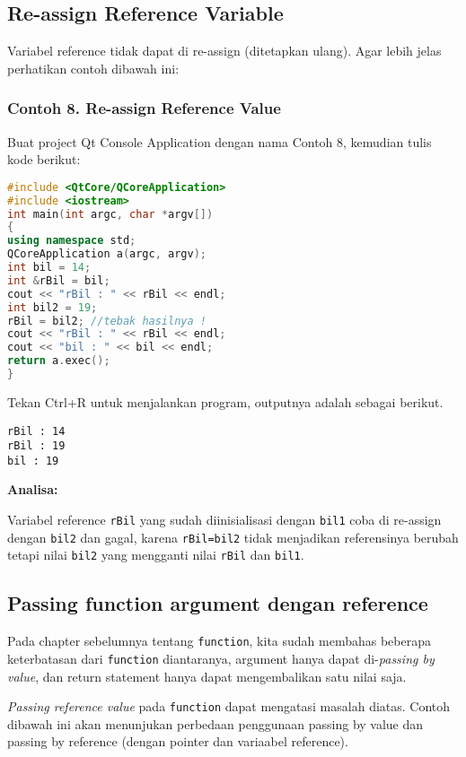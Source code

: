 \subsection{Re-assign Reference
Variable}\label{re-assign-reference-variable}

Variabel reference tidak dapat di re-assign (ditetapkan ulang). Agar
lebih jelas perhatikan contoh dibawah ini:

\subsubsection*{Contoh 8. Re-assign Reference Value}

Buat project Qt Console Application dengan nama Contoh 8, kemudian tulis
kode berikut:

\begin{lstlisting}[language=c++]
#include <QtCore/QCoreApplication>
#include <iostream>
int main(int argc, char *argv[])
{
using namespace std;
QCoreApplication a(argc, argv);
int bil = 14;
int &rBil = bil;
cout << "rBil : " << rBil << endl;
int bil2 = 19;
rBil = bil2; //tebak hasilnya !
cout << "rBil : " << rBil << endl;
cout << "bil : " << bil << endl;
return a.exec();
}
\end{lstlisting}

Tekan Ctrl+R untuk menjalankan program, outputnya adalah sebagai
berikut.

\begin{verbatim}
rBil : 14
rBil : 19
bil : 19
\end{verbatim}

\textbf{Analisa:}

Variabel reference \texttt{rBil} yang sudah diinisialisasi dengan
\texttt{bil1} coba di re-assign dengan \texttt{bil2} dan gagal, karena
\texttt{rBil=bil2} tidak menjadikan referensinya berubah tetapi nilai
\texttt{bil2} yang mengganti nilai \texttt{rBil} dan \texttt{bil1}.

\subsection{Passing function argument dengan
reference}\label{passing-function-argument-dengan-reference}

Pada chapter sebelumnya tentang \texttt{function}, kita sudah membahas
beberapa keterbatasan dari \texttt{function} diantaranya, argument hanya
dapat di-\emph{passing by value}, dan return statement hanya dapat
mengembalikan satu nilai saja.

\emph{Passing reference value} pada \texttt{function} dapat mengatasi
masalah diatas. Contoh dibawah ini akan menunjukan perbedaan penggunaan
passing by value dan passing by reference (dengan pointer dan variaabel
reference).

